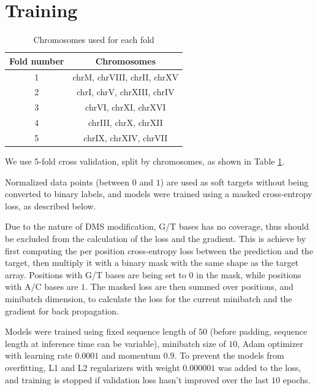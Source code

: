 \documentclass{proposal}
\begin{document}
\section{Training}


\begin{table}[h!]
    \centering
    \begin{tabular}{||c c||}
        \hline
        Fold number & Chromosomes \\ [0.5ex]
        \hline\hline
        1 & chrM, chrVIII, chrII, chrXV \\
        \hline
        2 & chrI, chrV, chrXIII, chrIV \\
        \hline
        3 & chrVI, chrXI, chrXVI \\
        \hline
        4 & chrIII, chrX, chrXII \\
        \hline
        5 & chrIX, chrXIV, chrVII \\ [1ex]
        \hline
    \end{tabular}
    \caption{Chromosomes used for each fold}
    \label{table:fold_chrom_split}
\end{table}


We use 5-fold cross validation, split by chromosomes, as shown in Table \ref{table:fold_chrom_split}.

Normalized data points (between $0$ and $1$) are used as soft targets without being converted to binary labels,
and models were trained using a masked cross-entropy loss, as described below.

Due to the nature of DMS modification, G/T bases has no coverage,
thus should be excluded from the calculation of the loss and the gradient.
This is achieve by first computing the per position cross-entropy loss between the prediction and the target,
then multiply it with a binary mask with the same shape as the target array.
Positions with G/T bases are being set to $0$ in the mask, while positions with A/C bases are $1$.
The masked loss are then summed over positions, and minibatch dimension,
to calculate the loss for the current minibatch and the gradient for back propagation.

Models were trained using fixed sequence length of $50$ (before padding, sequence length at inference time can be variable),
minibatch size of $10$, Adam optimizer with learning rate $0.0001$ and momentum $0.9$.
To prevent the models from overfitting, L1 and L2 regularizers with weight $0.000001$ was added to the loss,
and training is stopped if validation loss hasn't improved over the last $10$ epochs.
\end{document}
